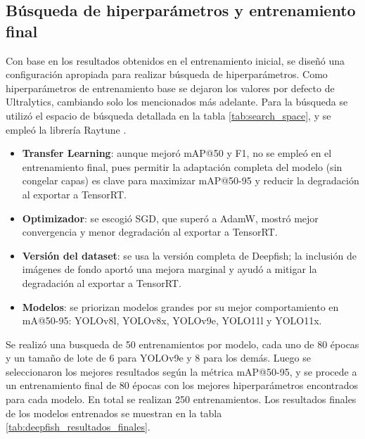 \subsection{Búsqueda de hiperparámetros y entrenamiento final}
Con base en los resultados obtenidos en el entrenamiento inicial, se diseñó una configuración apropiada para realizar búsqueda de hiperparámetros. Como hiperparámetros de entrenamiento base se dejaron los valores por defecto de Ultralytics, cambiando solo los mencionados más adelante. Para la búsqueda se utilizó el espacio de búsqueda detallada en la tabla \ref{tab:search_space}, y se empleó la librería Raytune \cite{Raytune}.

\begin{itemize}
    \item \textbf{Transfer Learning}: aunque mejoró mAP@50 y F1, no se empleó en el entrenamiento final, pues permitir la adaptación completa del modelo (sin congelar capas) es clave para maximizar mAP@50-95 y reducir la degradación al exportar a TensorRT.
    \item \textbf{Optimizador}: se escogió SGD, que superó a AdamW, mostró mejor convergencia y menor degradación al exportar a TensorRT.
    \item \textbf{Versión del dataset}: se usa la versión completa de Deepfish; la inclusión de imágenes de fondo aportó una mejora marginal y ayudó a mitigar la degradación al exportar a TensorRT.
    \item \textbf{Modelos}: se priorizan modelos grandes por su mejor comportamiento en mA@50-95: YOLOv8l, YOLOv8x, YOLOv9e, YOLO11l y YOLO11x.
\end{itemize}

Se realizó una busqueda de 50 entrenamientos por modelo, cada uno de 80 épocas y un tamaño de lote de 6 para YOLOv9e y 8 para los demás. Luego se seleccionaron los mejores resultados según la métrica mAP@50-95, y se procede a un entrenamiento final de 80 épocas con los mejores hiperparámetros encontrados para cada modelo. En total se realizan 250 entrenamientos. Los resultados finales de los modelos entrenados se muestran en la tabla \ref{tab:deepfish_resultados_finales}. 

